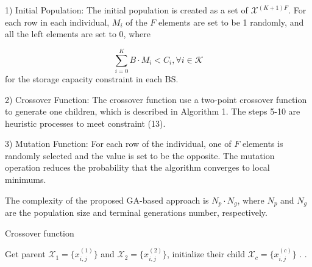 \documentclass[conference]{IEEEtran}
\begin{document}
1)	Initial Population: The initial population is created as a set of $\mathcal{X}^{(K+1)F}$. For each row in each individual, $M_i$ of the $F$ elements are set to be 1 randomly, and all the left elements are set to 0, where

\begin{equation}
\sum_{i=0}^K B\cdot M_i <C_i, \forall{i}\in\mathcal{K}
\end{equation}
for the storage capacity constraint in each BS.

2)	Crossover Function: The crossover function use a two-point crossover function to generate one children, which is described in Algorithm 1. The steps 5-10 are heuristic processes to meet constraint (13).

3)	Mutation Function:  For each row of the individual, one of $F$ elements is randomly selected and the value is set to be the opposite. The mutation operation reduces the probability that the algorithm converges to local minimums.

The complexity of the proposed GA-based approach is $N_p\cdot N_g$, where $ N_p$ and $N_g$ are the population size and terminal generations number, respectively.

\begin{algorithm}[htb]
 \caption{Crossover function}
 \label{alg:admission}
 \begin{algorithmic}[1] %
 \STATE Get parent $\mathcal{X}_1=\{x_{i,j}^{(1)}\}$ and $\mathcal{X}_2=\{x_{i,j}^{(2)}\}$,  initialize their child  $\mathcal{X}_c=\{x_{i,j}^{(c)}\}$
.
\ENDWHILE
{}
.
\ENDWHILE
\ENDFOR
\end{algorithmic}
\end{algorithm}
\end{document}
